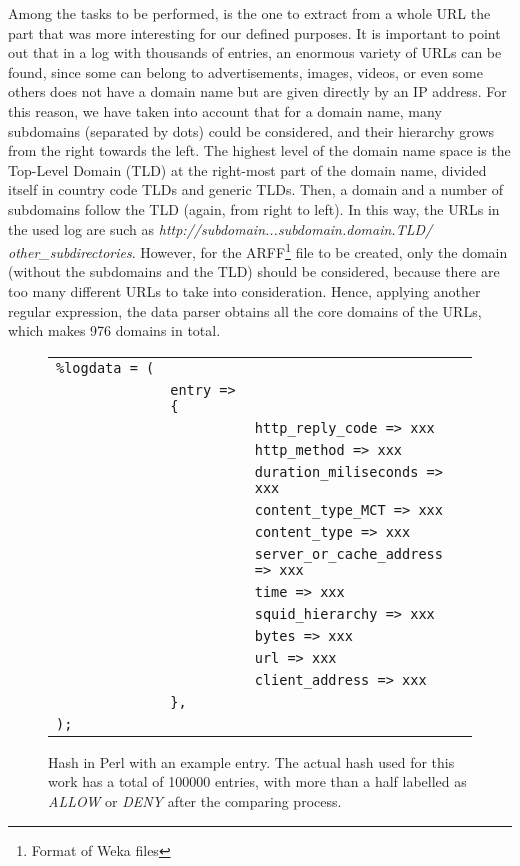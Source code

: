 \documentclass{llncs}
\begin{document}
Among the tasks to be performed, is the one to extract from a whole URL the part that was more interesting for our defined purposes. It is important to point out that in a log with thousands of entries, an enormous variety of URLs can be found, since some can belong to advertisements, images, videos, or even some others does not have a domain name but are given directly by an IP address. For this reason, we have taken into account that for a domain name, many subdomains (separated by dots) could be considered, and their hierarchy grows from the right towards the left. The highest level of the domain name space is the Top-Level Domain (TLD) at the right-most part of the domain name, divided itself in country code TLDs and generic TLDs. Then, a domain and a number of subdomains follow the TLD (again, from right to left). In this way, the URLs in the
used log are such as \textit{http://subdomain...subdomain.domain.TLD/} \textit{other\_subdirectories}. However, for the ARFF\footnote{Format of Weka files} file to be created, only the domain (without the subdomains and the TLD) should be considered, because there are too many different URLs to take into consideration. Hence, applying another regular expression, the data parser obtains all the core domains of the URLs, which makes 976 domains in total.

\begin{figure}[htb]
\centering
\begin{tabular}{ p{0.1cm} p{0.1cm} p{6cm} }
  \texttt{\%logdata~=~(} & & \\
   & \texttt{entry~=>\{} & \\
   & & \texttt{http\_reply\_code => xxx} \\
   & & \texttt{http\_method => xxx} \\
   & & \texttt{duration\_miliseconds => xxx} \\
   & & \texttt{content\_type\_MCT => xxx} \\
   & & \texttt{content\_type => xxx} \\
   & & \texttt{server\_or\_cache\_address => xxx} \\
   & & \texttt{time => xxx} \\
   & & \texttt{squid\_hierarchy => xxx} \\
   & & \texttt{bytes => xxx} \\
   & & \texttt{url => xxx} \\
   & & \texttt{client\_address => xxx} \\
   & \texttt{\},} & \\
  \texttt{);} & & \\
\end{tabular}
\caption{Hash in Perl with an example entry. The actual hash used for
  this work has a total of 100000 entries, with more than a half
  labelled as \textit{ALLOW} or \textit{DENY} after the comparing
  process. \label{fig:data_hash}} 
\end{figure}
\end{document}
